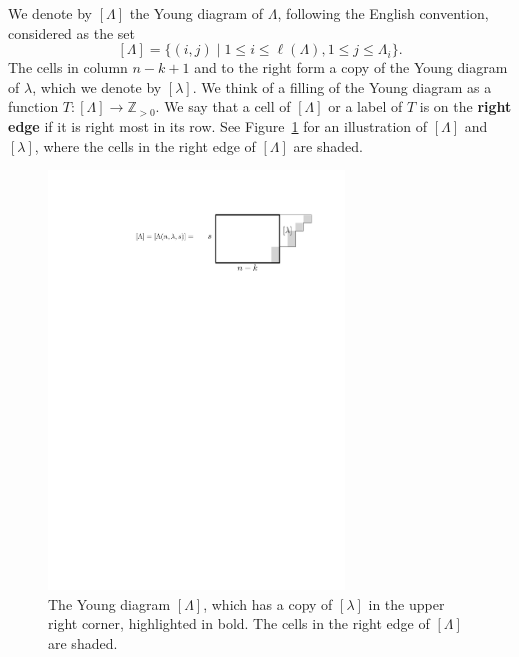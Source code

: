 \documentclass[12pt]{amsart}
\begin{document}
We denote by $[\Lambda]$ the Young diagram of $\Lambda$, following the English convention, considered as the set
$$[\Lambda]=\{(i,j)\mid 1\leq i\leq \ell(\Lambda), 1\leq j\leq \Lambda_i\}.$$
The cells in column $n-k+1$ and to the right form a copy of the Young diagram of $\lambda$, which we denote by $[\lambda]$. 
We think of a filling of the Young diagram as a function $T:[\Lambda]\rightarrow \mathbb{Z}_{>0}$.
We say that a cell of $[\Lambda]$ or a label of $T$ is on the \textbf{right edge} if it is right most in its row.
See Figure~\ref{fig:Lambda} for an illustration of $[\Lambda]$ and $[\lambda]$, where the cells in the right edge of $[\Lambda]$ are shaded. 

\begin{figure}
    \centering
    \includegraphics[width=0.7\textwidth]{Figures/LambdaExMain.pdf}
    \caption{The Young diagram $[\Lambda]$, which has a copy of $[\lambda]$ in the upper right corner, highlighted in bold. The cells in the right edge of $[\Lambda]$ are shaded.
    }
    \label{fig:Lambda}
\end{figure}
\end{document}
